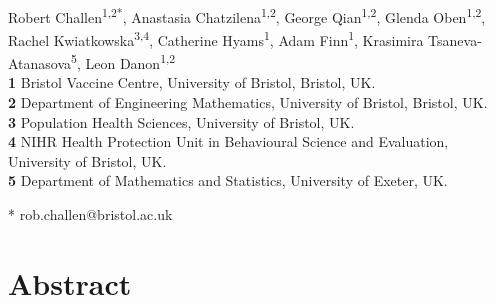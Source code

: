 \documentclass[10pt,letterpaper]{article}
\begin{document}
\vspace*{0.2in}

\begin{flushleft}
{\Large
\textbf{} 
}
\newline
\\
Robert Challen\textsuperscript{1,2*},
Anastasia Chatzilena\textsuperscript{1,2},
George Qian\textsuperscript{1,2},
Glenda Oben\textsuperscript{1,2},
Rachel Kwiatkowska\textsuperscript{3,4},
Catherine Hyams\textsuperscript{1},
Adam Finn\textsuperscript{1},
Krasimira Tsaneva-Atanasova\textsuperscript{5},
Leon Danon\textsuperscript{1,2}
\\
\bigskip
\textbf{1} Bristol Vaccine Centre, University of Bristol, Bristol, UK.\\
\textbf{2} Department of Engineering Mathematics, University of Bristol, Bristol, UK.\\
\textbf{3} Population Health Sciences, University of Bristol, UK.\\
\textbf{4} NIHR Health Protection Unit in Behavioural Science and Evaluation, University of Bristol, UK.\\
\textbf{5} Department of Mathematics and Statistics, University of Exeter, UK.\\
\bigskip

* rob.challen@bristol.ac.uk

\end{flushleft}
\section*{Abstract}
\end{document}

